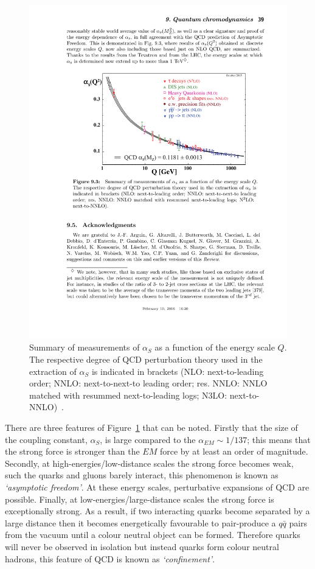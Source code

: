 \begin{figure}[!hbt]
  \begin{center}
    \includegraphics[width=0.7\linewidth, angle=0]{figs/Theory/qcd_running.pdf}
  \end{center}
  \caption[Summary of measurements of $\alpha_S$ as a function of the energy scale $Q$.
    The respective degree of QCD perturbation theory used in the extraction of $\alpha_S$ is indicated in brackets
    (NLO: next-to-leading order; NNLO: next-to-next-to leading order; res. NNLO: NNLO matched with resummed next-to-leading logs; N3LO: next-to-NNLO).]
          {Summary of measurements of $\alpha_S$ as a function of the energy scale $Q$.
            The respective degree of QCD perturbation theory used in the extraction of $\alpha_S$ is indicated in brackets
            (NLO: next-to-leading order; NNLO: next-to-next-to leading order; res. NNLO: NNLO matched with resummed next-to-leading logs; N3LO: next-to-NNLO)~\cite{theo-qcd}.}
  \label{fig:theo-qcd_running}
\end{figure}

There are three features of Figure~\ref{fig:theo-qcd_running} that can be noted.
Firstly that the size of the coupling constant, $\alpha_S$, is large compared to the
$\alpha_{EM} \sim 1/137$;
this means that the strong force is stronger than the $EM$ force by at least an order of magnitude.
Secondly, at high-energies/low-distance scales the strong force becomes weak, such the quarks and gluons barely interact, this phenomenon is known as
\textit{`asymptotic freedom'}.
At these energy scales, perturbative expansions of QCD are possible.
Finally, at low-energies/large-distance scales the strong force is exceptionally strong.
As a result, if two interacting quarks become separated by a large distance then it becomes energetically favourable to
pair-produce a $q\bar{q}$ pairs from the vacuum until a colour neutral object can be formed.
Therefore quarks will never be observed in isolation but instead quarks form colour neutral hadrons, this feature of QCD is known as \textit{`confinement'}.

